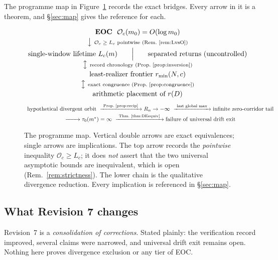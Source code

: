 \documentclass[11pt]{article}
\theoremstyle{plain}
\theoremstyle{definition}
\theoremstyle{remark}
\newcommand{\Occ}{\mathcal{O}}
\newcommand{\rmin}{r_{\min}}
\begin{document}
\noindent The programme map in Figure~\ref{fig:map} records the exact bridges. Every arrow in it is
a theorem, and \S\ref{sec:map} gives the reference for each.

\begin{figure}[t]
\centering
\begin{minipage}{0.92\textwidth}
\small
\[
\begin{array}{c}
\textbf{EOC}\ \ \Occ_c(m_0)=O(\log m_0)\\[2pt]
\big\downarrow\ \text{\scriptsize$\Occ_c\ge L_c$ pointwise (Rem.~\ref{rem:LvsO})}\\[2pt]
\text{single-window lifetime } L_c(m)
\qquad\Big|\qquad
\text{separated returns (uncontrolled)}\\[2pt]
\big\updownarrow\ \text{\scriptsize record chronology (Prop.~\ref{prop:inversion})}\\[2pt]
\text{least-realizer frontier } \rmin(N,c)\\[2pt]
\big\updownarrow\ \text{\scriptsize exact congruence (Prop.~\ref{prop:congruence})}\\[2pt]
\text{arithmetic placement of } r(D)
\end{array}
\]
\[
\begin{array}{c}
\text{hypothetical divergent orbit}
\ \xrightarrow{\ \text{Prop.~\ref{prop:recip}}\ } R_n\to-\infty
\ \xrightarrow{\ \text{last global max}\ } \text{infinite zero-corridor tail}\\[2pt]
\xrightarrow{\qquad} \tau_0(m^*)=\infty
\ \xrightarrow{\ \text{Thm.~\ref{thm:DEequiv}}\ }
\text{failure of universal drift exit}
\end{array}
\]
\end{minipage}
\caption{The programme map. Vertical double arrows are exact equivalences; single arrows are
implications. The top arrow records the \emph{pointwise} inequality $\Occ_c\ge L_c$; it does
\emph{not} assert that the two universal asymptotic bounds are inequivalent, which is open
(Rem.~\ref{rem:strictness}). The lower chain is the qualitative divergence reduction. Every
implication is referenced in \S\ref{sec:map}.}
\label{fig:map}
\end{figure}

\subsection{What Revision 7 changes}\label{sec:changelog}

Revision~7 is a \emph{consolidation of corrections}. Stated plainly: the verification record
improved, several claims were narrowed, and universal drift exit remains open. Nothing here proves
divergence exclusion or any tier of EOC.
\end{document}
